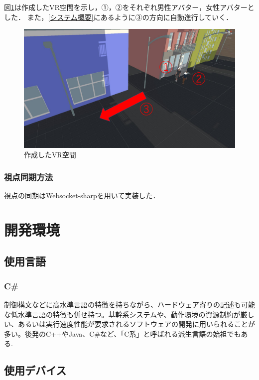 \documentclass[12pt,a4j,titlepage]{ltjsarticle}
\begin{document}
図\ref{fig:screen}は作成したVR空間を示し，①，②をそれぞれ男性アバター，女性アバターとした．
また，\ref{システム概要}にあるように③の方向に自動進行していく．

\begin{figure}[h]
\begin{center}
\includegraphics[keepaspectratio, scale=0.5]{screenshot.pdf}
\end{center}
 \caption{作成したVR空間}
 \label{fig:screen}
\end{figure}
\subsubsection{視点同期方法}
視点の同期はWebsocket-sharpを用いて実装した．

\clearpage

\section{開発環境}
\subsection{使用言語}
\subsubsection{C\#}
制御構文などに高水準言語の特徴を持ちながら、ハードウェア寄りの記述も可能な低水準言語の特徴も併せ持つ。基幹系システムや、動作環境の資源制約が厳しい、あるいは実行速度性能が要求されるソフトウェアの開発に用いられることが多い。後発のC++やJava、C\#など、「C系」と呼ばれる派生言語の始祖でもある.

\subsection{使用デバイス} 
\end{document}
